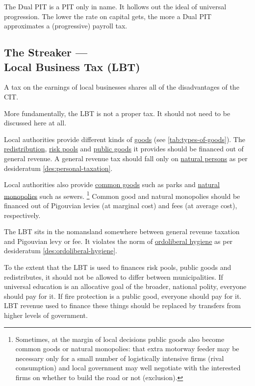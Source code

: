 The Dual PIT is a PIT only in name.
It hollows out the ideal of universal progression.
The lower the rate on capital gets, the more a Dual PIT approximates a (progressive) payroll tax.

\subsection[Business Tax]{The Streaker ---\\Local Business Tax (LBT)}
	\label{sec:ScoreLBT}
A tax on the earnings of local businesses shares all of the disadvantages of the CIT.

More fundamentally, the LBT is not a proper tax.
It should not need to be discussed here at all.

Local authorities provide different kinds of \hyperref[tab:types-of-goods]{goods} (see \autoref{tab:types-of-goods}).
The \hyperref[sec:fiscal-redistribution]{redistribution}, \hyperref[sec:state-insurance]{risk pools} and \hyperref[sec:public-good]{public goods} it provides should be financed out of general revenue.
A general revenue tax should fall only on \hyperref[des:personal-taxation]{natural persons} as per desideratum \ref{des:personal-taxation}.

Local authorities also provide \hyperref[sec:common-good]{common goods} such as parks and \hyperref[sec:natural-monopoly]{natural monopolies} such as sewers.
\footnote{
	Sometimes, at the margin of local decisions public goods also become common goods or natural monopolies:
	that extra motorway feeder may be necessary only for a small number of logistically intensive firms (rival consumption) and local government may well negotiate with the interested firms on whether to build the road or not (exclusion).
}
Common good and natural monopolies should be financed out of Pigouvian levies (at marginal cost) and fees (at average cost), respectively.

The LBT sits in the nomansland somewhere between general revenue taxation and Pigouvian levy or fee.
It violates the norm of \hyperref[des:ordoliberal-hygiene]{ordoliberal hygiene} as per desideratum \ref{des:ordoliberal-hygiene}.

To the extent that the LBT is used to finances risk pools, public goods and redistributes, it should not be allowed to differ between municipalities.
If universal education is an allocative goal of the broader, national polity, everyone should pay for it.
If fire protection is a public good, everyone should pay for it.
LBT revenue used to finance these things should be replaced by transfers from higher levels of government.

